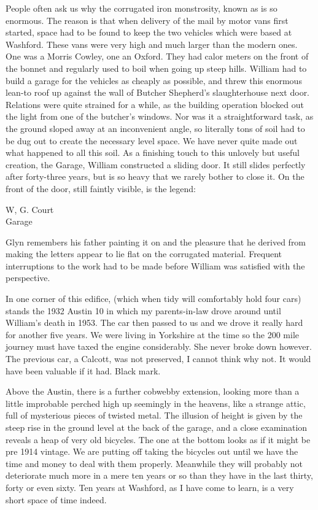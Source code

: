 \Flourish	 
 
People often ask us why the corrugated iron monstrosity, known as  is so enormous. The reason is that when delivery of the mail by motor vans first started, space had to be found to keep the two vehicles which were based at Washford. These vans were very high and much larger than the modern ones. One was a Morris Cowley, one an Oxford. They had calor meters on the front of the bonnet and regularly used to boil when going up steep hills. William had to build a garage for the vehicles as cheaply as possible, and threw this enormous lean-to roof up against the wall of Butcher Shepherd's slaughterhouse next door. Relations were quite strained for a while, as the building operation blocked out the light from one of the butcher's windows. Nor was it a straightforward task, as the ground sloped away at an inconvenient angle, so literally tons of soil had to be dug out to create the necessary level space. We have never quite made out what happened to all this soil. As a finishing touch to this unlovely but useful creation, the Garage, William constructed a sliding door. It still slides perfectly after forty-three years, but is so heavy that we rarely bother to close it. On the front of the door, still faintly visible, is the legend:

\begin{center}
W, G. Court\\
Garage
\end{center}


Glyn remembers his father painting it on and the pleasure that he derived from making the letters appear to lie flat on the corrugated material. Frequent interruptions to the work had to be made before William was satisfied with the perspective.

In one corner of this edifice, (which when tidy will comfortably hold four cars) stands the 1932 Austin 10 in which my parents-in-law drove around until William's death in 1953. The car then passed to us and we drove it really hard for another five years. We were living in Yorkshire at the time so the 200 mile journey must have taxed the engine considerably. She never broke down however. The previous car, a Calcott, was not preserved, I cannot think why not. It would have been valuable if it had. Black mark.

Above the Austin, there is a further cobwebby extension, looking more than a little improbable perched high up seemingly in the heavens, like a strange attic, full of mysterious pieces of twisted metal. The illusion of height is given by the steep rise in the ground level at the back of the garage, and a close examination reveals a heap of very old bicycles. The one at the bottom looks as if it might be pre 1914 vintage. We are putting off taking the bicycles out until we have the time and money to deal with them properly. Meanwhile they will probably not deteriorate much more in a mere ten years or so than they have in the last thirty, forty or even sixty. Ten years at Washford, as I have come to learn, is a very short space of time indeed.


